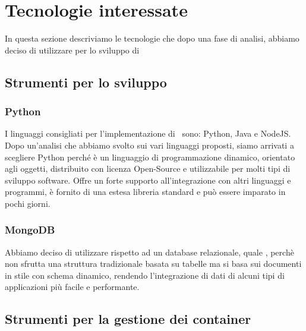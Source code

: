\section{Tecnologie interessate}
In questa sezione descriviamo le tecnologie che dopo una fase di analisi, abbiamo deciso di utilizzare per lo sviluppo di \progetto
\subsection{Strumenti per lo sviluppo} %

\subsubsection{Python}
I linguaggi consigliati per l'implementazione di \progetto\ sono: Python, Java e NodeJS. Dopo un'analisi che abbiamo svolto sui vari linguaggi proposti, siamo
arrivati a scegliere Python perché è un linguaggio di programmazione dinamico, orientato agli oggetti, distribuito con licenza Open-Source e utilizzabile
per molti tipi di sviluppo software. Offre un forte supporto all'integrazione con altri linguaggi e programmi, è fornito di una estesa libreria standard e
può essere imparato in pochi giorni.


\subsubsection{MongoDB}
Abbiamo deciso di utilizzare  rispetto ad un database relazionale, quale , perchè non sfrutta una struttura tradizionale basata su
tabelle ma si basa sui documenti in stile  con schema dinamico, rendendo l’integrazione di dati di alcuni tipi di applicazioni più facile e performante.

\subsection{Strumenti per la gestione dei container}

